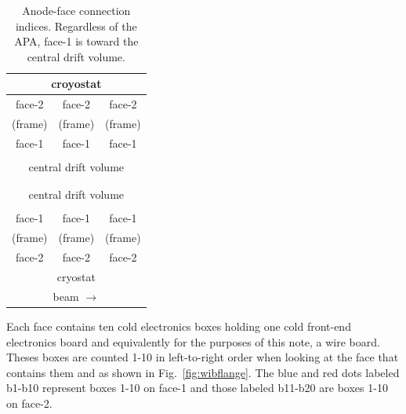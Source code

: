 \documentclass[pdftex,12pt,letter]{article}
\begin{document}
\begin{table}[htp]
  \centering
  \begin{tabular}[h]{|c|c|c|}
    \hline
    \hline
    \multicolumn{3}{|c|}{croyostat}\\
    \hline
    face-2 & face-2 & face-2 \\
    \hline
    (frame) & (frame) & (frame) \\
    \hline
    face-1 & face-1 & face-1 \\
    \hline
    \multicolumn{3}{|c|}{}\\
    \multicolumn{3}{|c|}{central drift volume}\\
    \multicolumn{3}{|c|}{}\\
    \hline
    \hline
    \hline
    \multicolumn{3}{|c|}{}\\
    \multicolumn{3}{|c|}{central drift volume}\\
    \multicolumn{3}{|c|}{}\\
    \hline
    face-1 & face-1 & face-1 \\
    \hline
    (frame) & (frame) & (frame) \\
    \hline
    face-2 & face-2 & face-2 \\
    \hline
    \multicolumn{3}{|c|}{cryostat}\\
    \hline
    \hline
    \multicolumn{3}{c}{beam $\longrightarrow$} \\    

  \end{tabular}
  \caption{Anode-face connection indices.  Regardless of the APA, face-1 is toward the central drift volume.}
  \label{tab:anodeface}
\end{table}

Each face contains ten cold electronics boxes holding one cold
front-end electronics board and equivalently for the purposes of this
note, a wire board.  Theses boxes are counted 1-10 in left-to-right
order when looking at the face that contains them and as shown in
Fig.~\ref{fig:wibflange}.  The blue and red dots labeled b1-b10
represent boxes 1-10 on face-1 and those labeled b11-b20 are boxes 1-10
on face-2.
\end{document}
